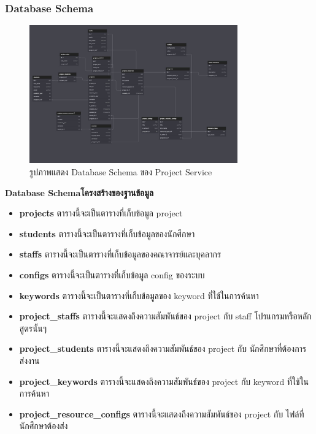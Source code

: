 \subsubsection{Database Schema}
\begin{figure}[H]
  \centering
  \includegraphics[width=0.8\textwidth]{pictures/project_db.JPG}
  \caption{รูปภาพแสดง Database Schema ของ Project Service}
  \label{fig:project_service}
\end{figure}
\textbf{\ifenglish Database Schema\else โครงสร้างของฐานข้อมูล\fi}
\begin{itemize}
  \item \textbf{projects} ตารางนี้จะเป็นตารางที่เก็บข้อมูล project
  \item \textbf{students} ตารางนี้จะเป็นตารางที่เก็บข้อมูลของนักศึกษา
  \item \textbf{staffs} ตารางนี้จะเป็นตารางที่เก็บข้อมูลของคณาจารย์และบุคลากร
  \item \textbf{configs} ตารางนี้จะเป็นตารางที่เก็บข้อมูล config ของระบบ
  \item \textbf{keywords} ตารางนี้จะเป็นตารางที่เก็บข้อมูลของ keyword ที่ใช้ในการค้นหา
  \item \textbf{project\_staffs} ตารางนี้จะแสดงถึงความสัมพันธ์ของ project กับ staff โปรแกรมหรือหลักสูตรนั้นๆ
  \item \textbf{project\_students} ตารางนี้จะแสดงถึงความสัมพันธ์ของ project กับ นักศึกษาที่ต้องการส่งงาน
  \item \textbf{project\_keywords} ตารางนี้จะแสดงถึงความสัมพันธ์ของ project กับ keyword ที่ใช้ในการค้นหา
  \item \textbf{project\_resource\_configs} ตารางนี้จะแสดงถึงความสัมพันธ์ของ project กับ ไฟล์ที่นักศึกษาต้องส่ง
\end{itemize}
